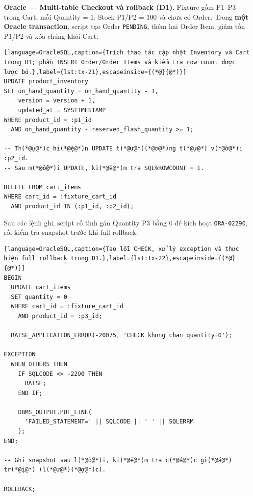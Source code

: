 \textbf{Oracle — Multi-table Checkout và rollback (D1).} Fixture gồm P1–P3 trong Cart, mỗi Quantity = 1; Stock P1/P2 = 100 và chưa có Order. Trong \textbf{một Oracle transaction}, script tạo Order \texttt{PENDING}, thêm hai Order Item, giảm tồn P1/P2 và xóa chúng khỏi Cart:

\begin{lstlisting}[language=OracleSQL,caption={Trích thao tác cập nhật Inventory và Cart trong D1; phần INSERT Order/Order Items và kiểm tra row count được lược bỏ.},label={lst:tx-21},escapeinside={(*@}{@*)}]
UPDATE product_inventory
SET on_hand_quantity = on_hand_quantity - 1,
    version = version + 1,
    updated_at = SYSTIMESTAMP
WHERE product_id = :p1_id
  AND on_hand_quantity - reserved_flash_quantity >= 1;

-- Th(*@ự@*)c hi(*@ệ@*)n UPDATE t(*@ư@*)(*@ơ@*)ng t(*@ự@*) v(*@ớ@*)i :p2_id.
-- Sau m(*@ỗ@*)i UPDATE, ki(*@ể@*)m tra SQL%ROWCOUNT = 1.

DELETE FROM cart_items
WHERE cart_id = :fixture_cart_id
  AND product_id IN (:p1_id, :p2_id);
\end{lstlisting}

Sau các lệnh ghi, script cố tình gán Quantity P3 bằng 0 để kích hoạt \texttt{ORA-\allowbreak{}02290}, rồi kiểm tra snapshot trước khi full rollback:

\begin{lstlisting}[language=OracleSQL,caption={Tạo lỗi CHECK, xử lý exception và thực hiện full rollback trong D1.},label={lst:tx-22},escapeinside={(*@}{@*)}]
BEGIN
  UPDATE cart_items
  SET quantity = 0
  WHERE cart_id = :fixture_cart_id
    AND product_id = :p3_id;

  RAISE_APPLICATION_ERROR(-20075, 'CHECK khong chan quantity=0');

EXCEPTION
  WHEN OTHERS THEN
    IF SQLCODE <> -2290 THEN
      RAISE;
    END IF;

    DBMS_OUTPUT.PUT_LINE(
      'FAILED_STATEMENT=' || SQLCODE || ' ' || SQLERRM
    );
END;

-- Ghi snapshot sau l(*@ỗ@*)i, ki(*@ể@*)m tra c(*@á@*)c gi(*@á@*) tr(*@ị@*) (l(*@ư@*)(*@ợ@*)c).

ROLLBACK;
\end{lstlisting}

